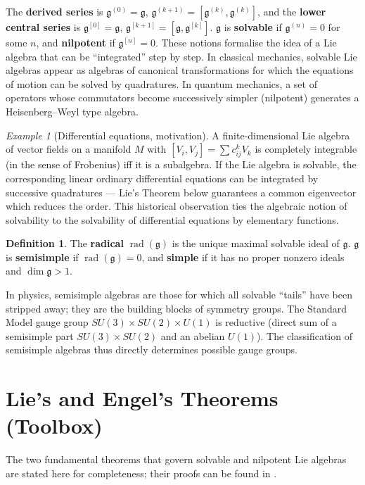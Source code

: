 \documentclass{article}
\theoremstyle{definition}
\newtheorem{definition}[theorem]{Definition}
\theoremstyle{remark}
\newtheorem{example}[theorem]{Example}
\newcommand{\g}{\mathfrak{g}}
\newcommand{\rad}{\operatorname{rad}}
\begin{document}
The \textbf{derived series} is $\g^{(0)} = \g$, $\g^{(k+1)} = [\g^{(k)},\g^{(k)}]$, and the
\textbf{lower central series} is $\g^{[0]} = \g$, $\g^{[k+1]} = [\g,\g^{[k]}]$.
$\g$ is \textbf{solvable} if $\g^{(n)} = 0$ for some $n$, and \textbf{nilpotent}
if $\g^{[n]} = 0$.
These notions formalise the idea of a Lie algebra that can be ``integrated''
step by step. In classical mechanics, solvable Lie algebras appear as algebras of
canonical transformations for which the equations of motion can be solved by
quadratures. In quantum mechanics, a set of operators whose commutators become
successively simpler (nilpotent) generates a Heisenberg–Weyl type algebra.

\begin{example}[Differential equations, motivation]
A finite‑dimensional Lie algebra of vector fields on a manifold $M$ with
$[V_i,V_j] = \sum c_{ij}^k V_k$ is completely integrable (in the sense of Frobenius)
iff it is a subalgebra.  If the Lie algebra is solvable, the corresponding linear
ordinary differential equations can be integrated by successive quadratures —
Lie’s Theorem below guarantees a common eigenvector which reduces the order.
This historical observation ties the algebraic notion of solvability to the
solvability of differential equations by elementary functions.
\end{example}

\begin{definition}
The \textbf{radical} $\rad(\g)$ is the unique maximal solvable ideal of $\g$.
$\g$ is \textbf{semisimple} if $\rad(\g) = 0$, and \textbf{simple} if it has no
proper nonzero ideals and $\dim\g > 1$.
\end{definition}
In physics, semisimple algebras are those for which all solvable ``tails'' have
been stripped away; they are the building blocks of symmetry groups. The Standard
Model gauge group $SU(3)\times SU(2)\times U(1)$ is reductive (direct sum of a
semisimple part $SU(3)\times SU(2)$ and an abelian $U(1)$). The classification
of semisimple algebras thus directly determines possible gauge groups.

\section{Lie’s and Engel’s Theorems (Toolbox)}

The two fundamental theorems that govern solvable and nilpotent Lie algebras are
stated here for completeness; their proofs can be found in \cite{Hall}.
\end{document}
